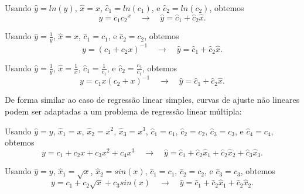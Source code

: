 \begin{example}%
Usando 
$\hat{y}=ln(y)$,  
$\hat{x}=x$, 
$\hat{c}_1=ln(c_1)$, e
$\hat{c}_2=ln(c_2)$, obtemos %
\begin{equation}
y=c_1 {c_2}^x
\quad \rightarrow \quad 
\hat{y}=\hat{c}_1+\hat{c}_2 \hat{x}.
\end{equation}
\vspace{-2pt}
\end{example}

\begin{example}%
Usando 
$\hat{y}=\frac{1}{y}$,  
$\hat{x}=x$, 
$\hat{c}_1=c_1$, e 
$\hat{c}_2=c_2$, obtemos %
\begin{equation}
y=\left(c_1 + {c_2} x \right)^{-1}
\quad \rightarrow \quad 
\hat{y}=\hat{c}_1+\hat{c}_2 \hat{x}.
\end{equation}
\vspace{-2pt}
\end{example}

\begin{example}%
Usando 
$\hat{y}=\frac{1}{y}$,  
$\hat{x}=\frac{1}{x}$, 
$\hat{c}_1=\frac{1}{c_1}$, e 
$\hat{c}_2=\frac{c_2}{c_1}$, obtemos %
\begin{equation}
y=c_1 x \left(c_2 + x\right)^{-1}
\quad \rightarrow \quad 
\hat{y}=\hat{c}_1+\hat{c}_2 \hat{x}.
\end{equation}
\vspace{-2pt}
\end{example}

De forma similar ao caso de regressão linear simples,
curvas de ajuste não lineares podem ser adaptadas a um problema de regressão linear múltipla:
\begin{example}%
Usando 
$\hat{y}=y$,  
$\hat{x}_1=x$,
$\hat{x}_2=x^2$,
$\hat{x}_3=x^3$, 
$\hat{c}_1=c_1$, 
$\hat{c}_2=c_2$, 
$\hat{c}_3=c_3$, e 
$\hat{c}_4=c_4$, obtemos %
\begin{equation}
y=c_1 +c_2 x + c_3 x^2 + c_4 x^3
\quad \rightarrow \quad 
\hat{y}=\hat{c}_1+\hat{c}_2 \hat{x}_1+\hat{c}_2 \hat{x}_2+\hat{c}_3 \hat{x}_3.
\end{equation}
\vspace{-2pt}
\end{example}

\begin{example}%
Usando 
$\hat{y}=y$,  
$\hat{x}_1=\sqrt{x}$,
$\hat{x}_2=sin(x)$, 
$\hat{c}_1=c_1$, 
$\hat{c}_2=c_2$, e 
$\hat{c}_3=c_3$, obtemos %
\begin{equation}
y=c_1 +c_2 \sqrt{x} + c_3 sin(x)
\quad \rightarrow \quad 
\hat{y}=\hat{c}_1+\hat{c}_2 \hat{x}_1+\hat{c}_2 \hat{x}_2.
\end{equation}
\vspace{-2pt}
\end{example}
